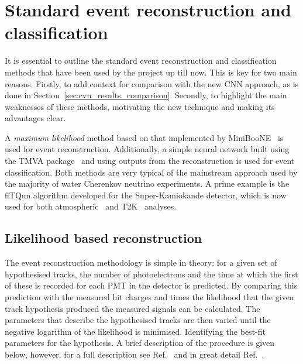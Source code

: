 \section{Standard event reconstruction and classification} %
\label{sec:cvn_old} %

It is essential to outline the standard event reconstruction and classification methods that have
been used by the \chips project up till now. This is key for two main reasons. Firstly, to add
context for comparison with the new CNN approach, as is done in
Section~\ref{sec:cvn_results_comparison}. Secondly, to highlight the main weaknesses of these
methods, motivating the new technique and making its advantages clear.

A \emph{maximum likelihood} method based on that implemented by MiniBooNE~\cite{patterson2009} is
used for event reconstruction. Additionally, a simple neural network built using the TMVA
package~\cite{hocker2007} and using outputs from the reconstruction is used for event
classification. Both methods are very typical of the mainstream approach used by the majority of
water Cherenkov neutrino experiments. A prime example is the fiTQun algorithm developed for the
Super-Kamiokande detector, which is now used for both atmospheric~\cite{jiang2019} and
T2K~\cite{missert2017} analyses.

\subsection{Likelihood based reconstruction} %
\label{sec:cvn_old_reco} %

The event reconstruction methodology is simple in theory: for a given set of hypothesised tracks,
the number of photoelectrons and the time at which the first of these is recorded for each PMT in
the detector is predicted. By comparing this prediction with the measured hit charges and times
the likelihood that the given track hypothesis produced the measured signals can be calculated.
The parameters that describe the hypothesised tracks are then varied until the negative logarithm
of the likelihood is minimised. Identifying the best-fit parameters for the hypothesis. A brief
description of the procedure is given below, however, for a full description see
Ref.~\cite{blake2016} and in great detail Ref.~\cite{perch2017}.

